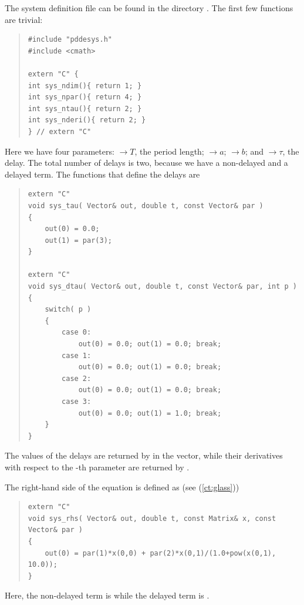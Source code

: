 \documentclass[10pt,a4paper]{ddedoc}
\begin{document}
The system definition file can be found in the directory
. The first few functions are trivial:
{ \small \begin{quote} \begin{lstlisting}[frame=single]
#include "pddesys.h"
#include <cmath>

extern "C" {
int sys_ndim(){ return 1; }
int sys_npar(){ return 4; }
int sys_ntau(){ return 2; }
int sys_nderi(){ return 2; }
} // extern "C"
\end{lstlisting} \end{quote} } \noindent
Here we have four parameters:
$\to T$, the period length;
$\to a$;
$\to b$; and
$\to \tau$, the delay.
The total number of delays is two, because we have a non-delayed and a delayed
term.
The functions that define the delays are
{ \small \begin{quote} \begin{lstlisting}[frame=single]
extern "C"
void sys_tau( Vector& out, double t, const Vector& par ) 
{
	out(0) = 0.0;
	out(1) = par(3);
}

extern "C"
void sys_dtau( Vector& out, double t, const Vector& par, int p ) 
{
	switch( p )
	{
		case 0:
			out(0) = 0.0; out(1) = 0.0; break;
		case 1:
			out(0) = 0.0; out(1) = 0.0; break;
		case 2:
			out(0) = 0.0; out(1) = 0.0; break;
		case 3:
			out(0) = 0.0; out(1) = 1.0; break;
	}
}
\end{lstlisting} \end{quote} } \noindent
The values of the delays are returned by  in the 
vector, while their derivatives with respect to the -th parameter are
returned by .

The right-hand side of the equation is defined as (see (\ref{ct:glass}))
{ \small \begin{quote} \begin{lstlisting}[frame=single]
extern "C"
void sys_rhs( Vector& out, double t, const Matrix& x, const Vector& par )
{
	out(0) = par(1)*x(0,0) + par(2)*x(0,1)/(1.0+pow(x(0,1), 10.0));
}
\end{lstlisting} \end{quote} } \noindent
Here, the non-delayed term is  while the delayed term
is .
\end{document}
